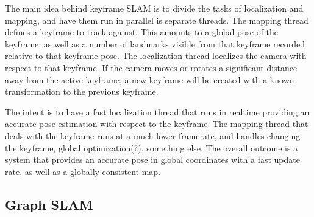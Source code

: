 The main idea behind keyframe SLAM is to divide the tasks of localization and mapping, and have
them run in parallel is separate threads.  The mapping thread defines a keyframe to track against. 
This amounts to a global pose of the keyframe, as well as a number of landmarks visible from that
keyframe recorded relative to that keyframe pose.  The localization thread localizes the camera
with respect to that keyframe.  If the camera moves or rotates a significant distance away from
the active keyframe, a new keyframe will be created with a known transformation to the previous
keyframe.

The intent is to have a fast localization thread that runs in realtime providing an accurate pose
estimation with respect to the keyframe.  The mapping thread that deals with the keyframe runs at a
much lower framerate, and handles changing the keyframe, global optimization(?), something else. 
The overall outcome is a system that provides an accurate pose in global coordinates with a fast
update rate, as well as a globally consistent map.

\subsection{Graph SLAM}
\label{subsec:graph_slam}

